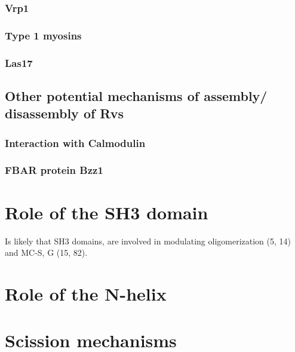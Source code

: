 		\subsubsection{Vrp1}
		\subsubsection{Type 1 myosins}
		\subsubsection{Las17}


	\subsection{Other potential mechanisms of assembly/ disassembly of Rvs}		
			\subsubsection{Interaction with Calmodulin}
			\subsubsection{FBAR protein Bzz1}
				
\section{Role of the SH3 domain}	
Is likely that SH3 domains, are involved in modulating oligomerization (5, 14) and MC-S, G (15, 82). 	
\section{Role of the N-helix}			
		
\section{Scission mechanisms}

